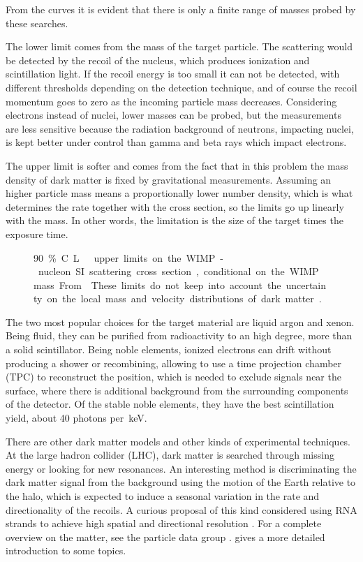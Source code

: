 From the curves it is evident that there is only a finite range of masses
probed by these searches.

The lower limit comes from the mass of the target particle. The scattering
would be detected by the recoil of the nucleus, which produces ionization and
scintillation light. If the recoil energy is too small it can not be detected,
with different thresholds depending on the detection technique, and of course
the recoil momentum goes to zero as the incoming particle mass decreases.
Considering electrons instead of nuclei, lower masses can be probed, but the
measurements are less sensitive because the radiation background of neutrons,
impacting nuclei, is kept better under control than gamma and beta rays which
impact electrons.

The upper limit is softer and comes from the fact that in this problem the mass
density of dark matter is fixed by gravitational measurements. Assuming an
higher particle mass means a proportionally lower number density, which is what
determines the rate together with the cross section, so the limits go up
linearly with the mass. In other words, the limitation is the size of the
target times the exposure time.

\begin{figure}
    
    
    \caption{\label{fig:sigmalimits} \SI{90}\% C.L.\ upper limits on the
    WIMP-nucleon SI scattering cross section, conditional on the WIMP mass.
    From \cite[fig.~27.1 p.~481]{zyla2020}. These limits do not keep into
    account the uncertainty on the local mass and velocity distributions of
    dark matter \cite[sec.~3.1]{baxter2021}.}
    
\end{figure}

The two most popular choices for the target material are liquid argon and
xenon. Being fluid, they can be purified from radioactivity to an high degree,
more than a solid scintillator. Being noble elements, ionized electrons can
drift without producing a shower or recombining, allowing to use a time
projection chamber (TPC) to reconstruct the position, which is needed to
exclude signals near the surface, where there is additional background from the
surrounding components of the detector. Of the stable noble elements, they have
the best scintillation yield, about 40 photons per~\si{keV}.

There are other dark matter models and other kinds of experimental techniques.
At the large hadron collider (LHC), dark matter is searched through missing
energy or looking for new resonances. An interesting method is discriminating
the dark matter signal from the background using the motion of the Earth
relative to the halo, which is expected to induce a seasonal variation in the
rate and directionality of the recoils. A curious proposal of this kind
considered using RNA strands to achieve high spatial and directional resolution
\cite{drukier2015}. For a complete overview on the matter, see the particle
data group \cite[sec.~27]{zyla2020}. \cite[ch.~1]{savarese2018} gives a more
detailed introduction to some topics.
